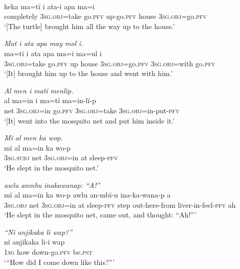 \\
\gll keka      ma{=}tï      i    ata-{i} apa    ma{=i}\\
completely  3\textsc{sg.obj}=take  go.\textsc{pfv}  up-go.\textsc{pfv}  house  3\textsc{sg.obj}=go.\textsc{pfv}\\
\glt ‘[The turtle] brought him all the way up to the house.’

\ex \textit{Mat i ata apa may mo}{\textit{l}} \textit{i.}\\
\gll ma{=}tï      i    ata  apa  ma{=i} m{a=ul} i\\
3\textsc{sg.obj}=take  go.\textsc{pfv}  up  house  3\textsc{sg.obj}=go.\textsc{pfv}  3\textsc{sg.obj}=with  go.\textsc{pfv}\\
\glt ‘[It] brought him up to the house and went with him.’

\ex \textit{A}{\textit{l}} {\textit{men i}} \textit{mat}{\textit{ï}} \textit{menlïp.}\\
\gll a{l} ma=in      i ma{=}t{ï} m{a=i}n{{}-}lï{{}-}p\\
net  3\textsc{sg.obj=}in  go.\textsc{pfv}  3\textsc{sg.obj}=take  3\textsc{sg.obj}=in-put-\textsc{pfv}\\
\glt ‘{[It] went into the mosquito net and} put him inside {it}.’

\ex \textit{M}{\textit{ï al}} \textit{men ka wop.}\\
\gll mï      al m{a=i}n ka  wo-p\\
3\textsc{sg.subj}  net  3\textsc{sg.obj}=in  at  sleep-\textsc{pfv}\\
\glt ‘He slept in the mosquito net.’

 {\textit{awlu}}{ }{\textit{anmbu}}{ \textit{inakawanap: “A!”}}\\
\gll mï      al ma{=i}n ka  wo-p    awlu  {an-mbï-u} ina-ka-wana-p    a\\
3\textsc{sg.obj}  net  3\textsc{sg.obj=}in  at  sleep-\textsc{pfv}  step  out-here-from liver-in-feel{{}-}\textsc{pfv}  ah\\
\glt ‘He slept in the mosquito net, came out, and thought: “Ah!”’

\ex \textit{“Nï anjikaka li wap?”}\\
\gll nï    anjikaka  li-i        wap\\
{1}\textsc{sg}  how    down-go.\textsc{pfv}  {be.}\textsc{pst}\\
\glt ‘“{How did I come down like this?”}’

